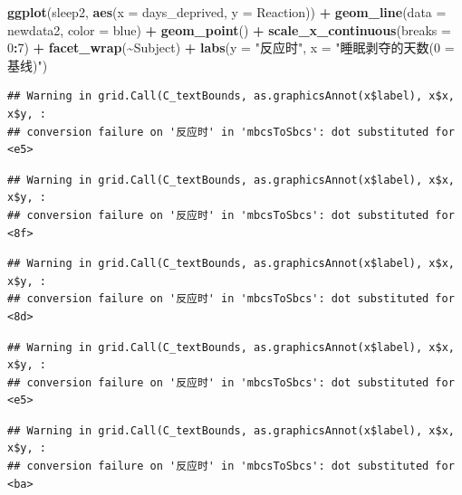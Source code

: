 \documentclass[
]{book}
\newenvironment{Shaded}{\begin{snugshade}}{\end{snugshade}}
\newcommand{\AttributeTok}[1]{\textcolor[rgb]{0.13,0.29,0.53}{#1}}
\newcommand{\DecValTok}[1]{\textcolor[rgb]{0.00,0.00,0.81}{#1}}
\newcommand{\FunctionTok}[1]{\textcolor[rgb]{0.13,0.29,0.53}{\textbf{#1}}}
\newcommand{\NormalTok}[1]{#1}
\newcommand{\SpecialCharTok}[1]{\textcolor[rgb]{0.81,0.36,0.00}{\textbf{#1}}}
\newcommand{\StringTok}[1]{\textcolor[rgb]{0.31,0.60,0.02}{#1}}
\begin{document}
\begin{Shaded}
\begin{Highlighting}[]
\FunctionTok{ggplot}\NormalTok{(sleep2, }\FunctionTok{aes}\NormalTok{(}\AttributeTok{x =}\NormalTok{ days\_deprived, }\AttributeTok{y =}\NormalTok{ Reaction)) }\SpecialCharTok{+}
  \FunctionTok{geom\_line}\NormalTok{(}\AttributeTok{data =}\NormalTok{ newdata2,}
            \AttributeTok{color =} \StringTok{\textquotesingle{}blue\textquotesingle{}}\NormalTok{) }\SpecialCharTok{+}
  \FunctionTok{geom\_point}\NormalTok{() }\SpecialCharTok{+}
  \FunctionTok{scale\_x\_continuous}\NormalTok{(}\AttributeTok{breaks =} \DecValTok{0}\SpecialCharTok{:}\DecValTok{7}\NormalTok{) }\SpecialCharTok{+}
  \FunctionTok{facet\_wrap}\NormalTok{(}\SpecialCharTok{\textasciitilde{}}\NormalTok{Subject) }\SpecialCharTok{+}
  \FunctionTok{labs}\NormalTok{(}\AttributeTok{y =} \StringTok{"反应时"}\NormalTok{, }\AttributeTok{x =} \StringTok{"睡眠剥夺的天数(0 = 基线)"}\NormalTok{)}
\end{Highlighting}
\end{Shaded}

\begin{verbatim}
## Warning in grid.Call(C_textBounds, as.graphicsAnnot(x$label), x$x, x$y, :
## conversion failure on '反应时' in 'mbcsToSbcs': dot substituted for <e5>
\end{verbatim}

\begin{verbatim}
## Warning in grid.Call(C_textBounds, as.graphicsAnnot(x$label), x$x, x$y, :
## conversion failure on '反应时' in 'mbcsToSbcs': dot substituted for <8f>
\end{verbatim}

\begin{verbatim}
## Warning in grid.Call(C_textBounds, as.graphicsAnnot(x$label), x$x, x$y, :
## conversion failure on '反应时' in 'mbcsToSbcs': dot substituted for <8d>
\end{verbatim}

\begin{verbatim}
## Warning in grid.Call(C_textBounds, as.graphicsAnnot(x$label), x$x, x$y, :
## conversion failure on '反应时' in 'mbcsToSbcs': dot substituted for <e5>
\end{verbatim}

\begin{verbatim}
## Warning in grid.Call(C_textBounds, as.graphicsAnnot(x$label), x$x, x$y, :
## conversion failure on '反应时' in 'mbcsToSbcs': dot substituted for <ba>
\end{verbatim}
\end{document}
